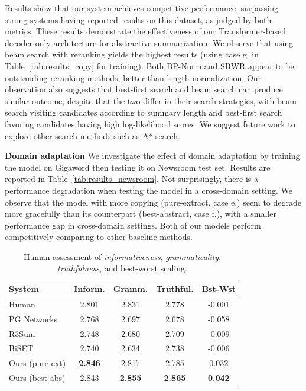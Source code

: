 \documentclass[letterpaper]{article} %
\begin{document}
Results show that our system achieves competitive performance, surpassing strong systems having reported results on this dataset, as judged by both metrics. 
These results demonstrate the effectiveness of our Transformer-based decoder-only architecture for abstractive summarization.
We observe that using beam search with reranking yields the highest results (using case g. in Table~\ref{tab:results_copy} for training).
Both BP-Norm and SBWR appear to be outstanding reranking methods, better than length normalization.
Our observation also suggests that best-first search and beam search can produce similar outcome, despite that the two differ in their search strategies, with beam search visiting candidates according to summary length and best-first search favoring candidates having high log-likelihood scores.
We suggest future work to explore other search methods such as A* search.


\vspace{0.08in}
\noindent\textbf{Domain adaptation}\quad
We investigate the effect of domain adaptation by training the model on Gigaword then testing it on Newsroom test set.
Results are reported in Table~\ref{tab:results_newsroom}.
Not surprisingly, there is a performance degradation when testing the model in a cross-domain setting.
We observe that the model with more copying (pure-extract, case e.) seem to degrade more gracefully than its counterpart (best-abstract, case f.), with a smaller performance gap in cross-domain settings.
Both of our models perform competitively comparing to other baseline methods.


\begin{table}[t]
\setlength{\tabcolsep}{5pt}
\renewcommand{\arraystretch}{1.08}
\centering
\begin{small}
\begin{tabular}{|l|cccc|}
\hline
\textbf{System} & \textbf{Inform.} & \textbf{Gramm.} & \textbf{Truthful.} & \textbf{Bst-Wst}\\
\hline
Human & 2.801 & 2.831 & 2.778 & -0.001\\
PG Networks & 2.768 & 2.697 & 2.678 & -0.058\\
R3Sum & 2.748 & 2.680 & 2.709 & -0.009\\
BiSET & 2.740 & 2.634 & 2.738 & -0.006\\
Ours (pure-ext) & \textbf{2.846} & 2.817 & 2.785 & 0.032\\
Ours (best-abs) & 2.843 & \textbf{2.855} & \textbf{2.865} & \textbf{0.042}\\
\hline
\end{tabular}
\end{small}
\caption{Human assessment of \emph{informativeness}, \emph{grammaticality}, \emph{truthfulness}, and best-worst scaling.}
\label{tab:human_giga}
\end{table}
\end{document}
